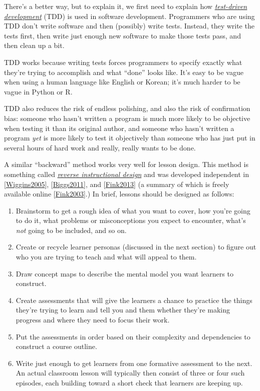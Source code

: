 \documentclass[10pt,statementpaper]{memoir}
\begin{document}
There's a better way, but to explain it, we first need to explain how
\emph{\href{gloss.html\#test-driven-development}{test-driven
development}} (TDD) is used in software development. Programmers who are
using TDD don't write software and then (possibly) write tests. Instead,
they write the tests first, then write just enough new software to make
those tests pass, and then clean up a bit.

TDD works because writing tests forces programmers to specify exactly
what they're trying to accomplish and what ``done'' looks like. It's
easy to be vague when using a human language like English or Korean;
it's much harder to be vague in Python or R.

TDD also reduces the risk of endless polishing, and also the risk of
confirmation bias: someone who hasn't written a program is much more
likely to be objective when testing it than its original author, and
someone who hasn't written a program \emph{yet} is more likely to test
it objectively than someone who has just put in several hours of hard
work and really, really wants to be done.

A similar ``backward'' method works very well for lesson design. This
method is something called
\emph{\href{gloss.html\#reverse-instructional-design}{reverse
instructional design}} and was developed independent in
{[}\href{biblio.html\#wiggins-mctighe}{Wiggins2005}{]},
{[}\href{biblio.html\#biggs-tang-quality}{Biggs2011}{]}, and
{[}\href{biblio.html\#fink-significant}{Fink2013}{]} (a summary of which
is freely available online
{[}\href{biblio.html\#fink-short}{Fink2003}{]}.) In brief, lessons
should be designed as follows:

\begin{enumerate}
\def\labelenumi{\arabic{enumi}.}
\item
  Brainstorm to get a rough idea of what you want to cover, how you're
  going to do it, what problems or misconceptions you expect to
  encounter, what's \emph{not} going to be included, and so on.
\item
  Create or recycle learner personas (discussed in the next section) to
  figure out who you are trying to teach and what will appeal to them.
\item
  Draw concept maps to describe the mental model you want learners to
  construct.
\item
  Create assessments that will give the learners a chance to practice
  the things they're trying to learn and tell you and them whether
  they're making progress and where they need to focus their work.
\item
  Put the assessments in order based on their complexity and
  dependencies to construct a course outline.
\item
  Write just enough to get learners from one formative assessment to the
  next. An actual classroom lesson will typically then consist of three
  or four such episodes, each building toward a short check that
  learners are keeping up.
\end{enumerate}
\end{document}

